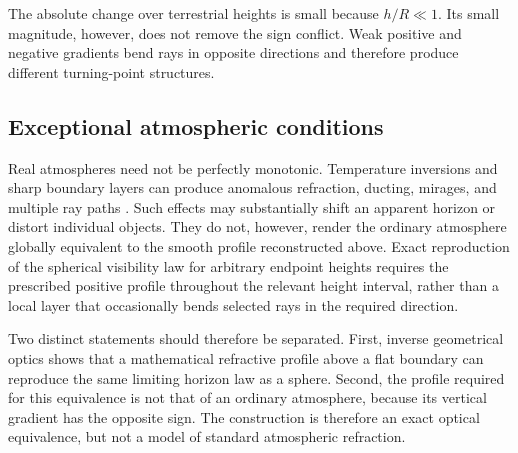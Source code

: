 The absolute change over terrestrial heights is small because $h/R\ll1$.
Its small magnitude, however, does not remove the sign conflict. Weak positive
and negative gradients bend rays in opposite directions and therefore produce
different turning-point structures.

\subsection{Exceptional atmospheric conditions}

Real atmospheres need not be perfectly monotonic. Temperature inversions and
sharp boundary layers can produce anomalous refraction, ducting, mirages, and
multiple ray paths \cite{bean1966radio,itur2019p453,nener2003analytical}.
Such effects may substantially shift an apparent horizon
or distort individual objects. They do not, however, render the ordinary
atmosphere globally equivalent to the smooth profile reconstructed above.
Exact reproduction of the spherical visibility law for arbitrary endpoint
heights requires the prescribed positive profile throughout the relevant
height interval, rather than a local layer that occasionally bends selected
rays in the required direction.

Two distinct statements should therefore be separated. First, inverse
geometrical optics shows that a mathematical refractive profile above a flat
boundary can reproduce the same limiting horizon law as a sphere. Second, the
profile required for this equivalence is not that of an ordinary atmosphere,
because its vertical gradient has the opposite sign. The construction is
therefore an exact optical equivalence, but not a model of standard atmospheric
refraction.

